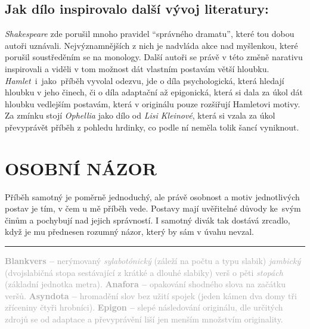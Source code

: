 \documentclass[A4paper]{extarticle} %
\begin{document}
\subsection*{Jak dílo inspirovalo další vývoj literatury:}
\noindent
\textit{Shakespeare} zde porušil mnoho pravidel \enquote{správného dramatu}, které tou dobou autoři uznávali.
Nejvýznamnějších z nich je nadvláda akce nad myšlenkou, které porušil soustředěním se na monology.
Další autoři se právě v této změně narativu inspirovali a viděli v tom možnost dát vlastním postavám větší hloubku.
\textit{Hamlet}~i~jako~příběh vyvolal odezvu, jde o díla psychologická, která hledají hloubku v jeho činech, či o díla adaptační až epigonická, která si dala za úkol dát hloubku vedlejším postavám, která v originálu pouze rozšiřují Hamletovi motivy. \\
Za zmínku stojí \textit{Ophellia} jako dílo od \textit{Lisi Kleinové}, která si vzala za úkol převyprávět příběh z pohledu hrdinky, co podle ní neměla tolik šancí vyniknout.


\section*{OSOBNÍ NÁZOR}
\noindent 
Příběh samotný je poměrně jednoduchý, ale právě osobnost a motiv jednotlivých postav je tím, v čem u mě příběh vede.
Postavy mají uvěřitelné důvody ke~svým činům a pochybují nad jejich správností.
I samotný divák tak dostává zrcadlo, když je mu přednesen rozumný názor, který by sám v úvahu nevzal.
    
\vfill

\noindent\begin{minipage}{\textwidth}
    \textcolor{darkgray}{\rule{\linewidth}{0.4pt}
    \changefontsize{5pt}\footnotesize
    \textbf{Blankvers --} nerýmovaný \textit{sylabotónický} (záleží na počtu a typu slabik) \textit{jambický} (dvojslabičná stopa sestávající z krátké a dlouhé slabiky) verš o pěti \textit{stopách} (základní jednotka metra).
    \textbf{Anafora --} opakování shodného slova na začátku veršů.
    \textbf{Asyndota --} hromadění slov bez užití spojek (jeden kámen dva domy tři zříceniny čtyři hrobníci).
    \textbf{Epigon --} slepé následování originálu, dle určitých zdrojů se od adaptace a převyprávění liší jen menším množstvím originality.
    }
\end{minipage}
\end{document}
